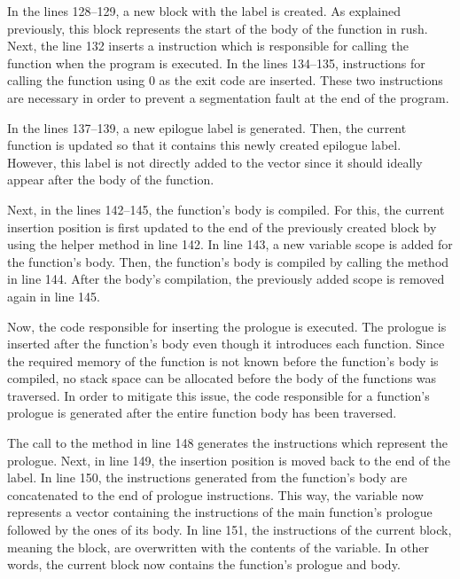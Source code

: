 In the lines 128--129, a new block with the  label is created.
As explained previously, this block represents the start of the body of the  function in rush.
Next, the line 132 inserts a  instruction which is responsible for calling the  function when the program is executed.
In the lines 134--135, instructions for calling the  function using 0 as the exit code are inserted.
These two instructions are necessary in order to prevent a segmentation fault at the end of the program.

In the lines 137--139, a new epilogue label is generated.
Then, the current function is updated so that it contains this newly created epilogue label.
However, this label is not directly added to the   vector since it should ideally appear after the body of the function.

Next, in the lines 142--145, the  function's body is compiled.
For this, the current insertion position is first updated to the end of the previously created  block by using the helper method  in line 142.
In line 143, a new variable scope is added for the function's body.
Then, the function's body is compiled by calling the  method in line 144.
After the body's compilation, the previously added scope is removed again in line 145.

Now, the code responsible for inserting the prologue is executed.
The prologue is inserted after the function's body even though it introduces each function.
Since the required memory of the function is not known before the function's body is compiled,
no stack space can be allocated before the body of the functions was traversed.
In order to mitigate this issue, the code responsible for a function's prologue is generated after the entire function body has been traversed.


The call to the method  in line 148 generates the instructions which represent the prologue.
Next, in line 149, the insertion position is moved back to the end of the  label.
In line 150, the instructions generated from the function's body are concatenated to the end of prologue instructions.
This way, the variable  now represents a vector containing the instructions of the main function's prologue followed by the ones of its body.
In line 151, the instructions of the current block, meaning the  block, are overwritten with the contents of the variable.
In other words, the current block now contains the function's prologue and body.

